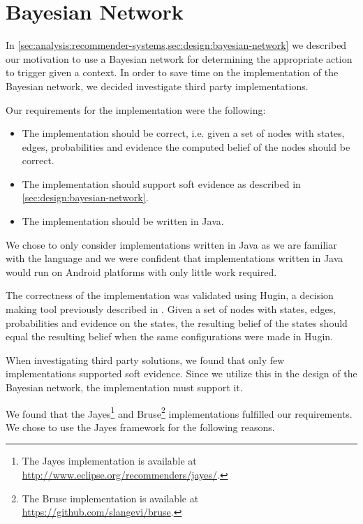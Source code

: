 \section{Bayesian Network}
\label{sec:implementation:bayesian-network}

In \cref{sec:analysis:recommender-systems,sec:design:bayesian-network} we described our motivation to use a Bayesian network for determining the appropriate action to trigger given a context. In order to save time on the implementation of the Bayesian network, we decided investigate third party implementations.

Our requirements for the implementation were the following:

\begin{itemize}
\item The implementation should be correct, i.e. given a set of nodes with states, edges, probabilities and evidence the computed belief of the nodes should be correct.
\item The implementation should support soft evidence as described in \cref{sec:design:bayesian-network}.
\item The implementation should be written in Java.
\end{itemize}

We chose to only consider implementations written in Java as we are familiar with the language and we were confident that implementations written in Java would run on Android platforms with only little work required. 

The correctness of the implementation was validated using Hugin, a decision making tool previously described in . Given a set of nodes with states, edges, probabilities and evidence on the states, the resulting belief of the states should equal the resulting belief when the same configurations were made in Hugin.

When investigating third party solutions, we found that only few implementations supported soft evidence. Since we utilize this in the design of the Bayesian network, the implementation must support it. 

We found that the Jayes\footnote{The Jayes implementation is available at \url{http://www.eclipse.org/recommenders/jayes/}.} and Bruse\footnote{The Bruse implementation is available at \url{https://github.com/slangevi/bruse}.} implementations fulfilled our requirements. We chose to use the Jayes framework for the following reasons.

